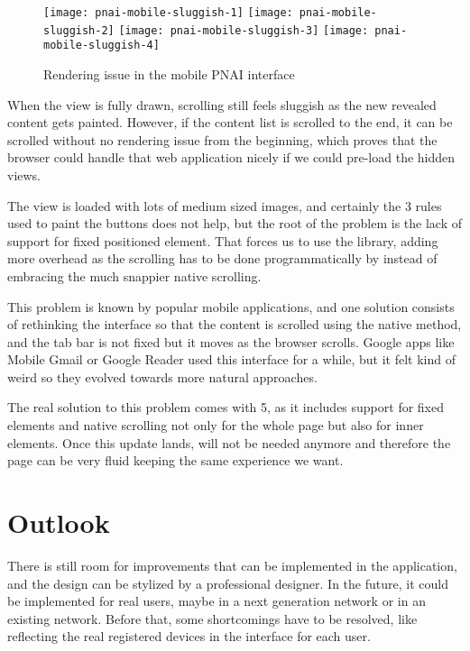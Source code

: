 \begin{figure}[htbp]
  \centering
    \texttt{[image: pnai-mobile-sluggish-1]}
    \texttt{[image: pnai-mobile-sluggish-2]}
    \texttt{[image: pnai-mobile-sluggish-3]}
    \texttt{[image: pnai-mobile-sluggish-4]}
  \caption{Rendering issue in the mobile PNAI interface}
  \label{fig:pnai-mobile-sluggish}
\end{figure}

When the view is fully drawn, scrolling still feels sluggish as the new revealed content gets painted.
However, if the content list is scrolled to the end, it can be scrolled without no rendering issue from the beginning, which proves that the browser could handle that web application nicely if we could pre-load the hidden views.

The view is loaded with lots of medium sized images, and certainly the 3 rules used to paint the buttons does not help, but the root of the problem is the lack of support for fixed positioned element.
That forces us to use the  library, adding more overhead as the scrolling has to be done programmatically by  instead of embracing the much snappier native scrolling.

This problem is known by popular mobile applications, and one solution consists of rethinking the interface so that the content is scrolled using the native method, and the tab bar is not fixed but it moves as the browser scrolls.
Google apps like Mobile Gmail or Google Reader used this interface for a while, but it felt kind of weird so they evolved towards more natural approaches.

The real solution to this problem comes with  5, as it includes support for fixed elements and native scrolling not only for the whole page but also for inner elements.
Once this update lands,  will not be needed anymore and therefore the page can be very fluid keeping the same experience we want.
\nicesectionending

\section{Outlook} %
\label{sec:outlook}

There is still room for improvements that can be implemented in the application, and the design can be stylized by a professional designer.
In the future, it could be implemented for real users, maybe in a next generation network or in an existing network.
Before that, some shortcomings have to be resolved, like reflecting the real registered devices in the interface for each user.

